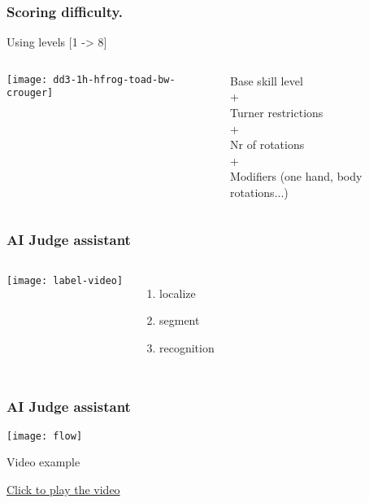 \documentclass[aspectratio=169]{beamer}
\begin{document}
\begin{frame}
  \frametitle{Scoring difficulty.}
  \vspace{-0.3cm}
  Using levels [1 -> 8]
  \vspace{0.2cm}

  \begin{columns}[c]
  
    \texttt{[image: dd3-1h-hfrog-toad-bw-crouger]}

    Base skill level \\
    + \\
    Turner restrictions \\
    + \\
    Nr of rotations \\
    + \\
    Modifiers (one hand, body rotations...)

  \end{columns}
\end{frame}

\begin{frame}
  \frametitle{AI Judge assistant}

  \begin{columns}[c]
  
    \texttt{[image: label-video]}

    \begin{enumerate}
      \item localize
      \item segment
      \item recognition
    \end{enumerate}

  \end{columns}
\end{frame}

\begin{frame}
  \frametitle{AI Judge assistant}

  \texttt{[image: flow]}

\end{frame}

\begin{frame}{Video example}

  \href{run:1315_annotated.mp4}{Click to play the video}

\end{frame}
\end{document}
